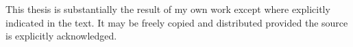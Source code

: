 \begin{singlespace}
\begin{titlepage}
        {\begin{flushleft}
        	\begin{spacing}{1.1}
        		\normalsize This thesis is substantially the result of my own work except where explicitly indicated in the text. It may be freely copied and distributed provided the source is explicitly acknowledged.
        	\end{spacing}
       	\end{flushleft}
    	}
        
    \end{titlepage}
\end{singlespace}

%

